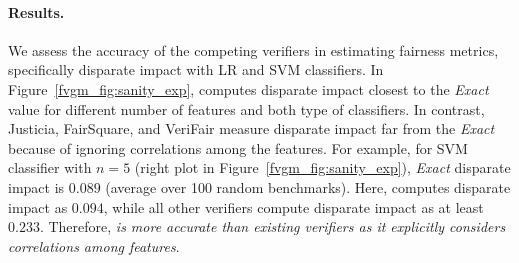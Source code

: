 \paragraph{Results.} 
 We  assess the accuracy of the competing verifiers in estimating fairness metrics, specifically disparate impact with LR and SVM classifiers. In Figure~\ref{fvgm_fig:sanity_exp}, {\fvgm} computes disparate impact closest to the \textit{Exact} value for different number of features and both type of classifiers. In contrast, Justicia, FairSquare, and VeriFair measure disparate impact far from the \textit{Exact} because of ignoring correlations among the features. For example, for SVM classifier with  $ n = 5 $ (right plot in Figure~\ref{fvgm_fig:sanity_exp}), \textit{Exact} disparate impact is $ 0.089 $ (average over 100 random benchmarks). Here, {\fvgm} computes disparate impact as $ 0.094 $, while all other verifiers compute disparate impact as at least $ 0.233 $. Therefore, \textit{{\fvgm} is more accurate than existing verifiers as it explicitly considers correlations among features}. 








